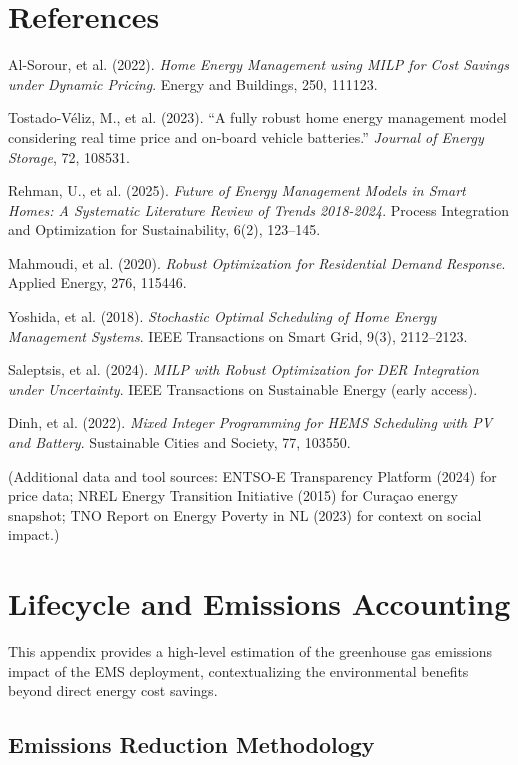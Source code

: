 \documentclass[12pt,a4paper]{article}
\begin{document}
\clearpage

\section*{References}

Al-Sorour, et al. (2022). \textit{Home Energy Management using MILP for Cost Savings under Dynamic Pricing}. Energy and Buildings, 250, 111123.

Tostado-Véliz, M., et al. (2023). “A fully robust home energy management model considering real time price and on-board vehicle batteries.” \textit{Journal of Energy Storage}, 72, 108531.

Rehman, U., et al. (2025). \textit{Future of Energy Management Models in Smart Homes: A Systematic Literature Review of Trends 2018-2024}. Process Integration and Optimization for Sustainability, 6(2), 123–145.

Mahmoudi, et al. (2020). \textit{Robust Optimization for Residential Demand Response}. Applied Energy, 276, 115446.

Yoshida, et al. (2018). \textit{Stochastic Optimal Scheduling of Home Energy Management Systems}. IEEE Transactions on Smart Grid, 9(3), 2112–2123.

Saleptsis, et al. (2024). \textit{MILP with Robust Optimization for DER Integration under Uncertainty}. IEEE Transactions on Sustainable Energy (early access).

Dinh, et al. (2022). \textit{Mixed Integer Programming for HEMS Scheduling with PV and Battery}. Sustainable Cities and Society, 77, 103550.

(Additional data and tool sources: ENTSO-E Transparency Platform (2024) for price data; NREL Energy Transition Initiative (2015) for Curaçao energy snapshot; TNO Report on Energy Poverty in NL (2023) for context on social impact.)

\clearpage

\appendix
\section{Lifecycle and Emissions Accounting}\label{app:emissions}

This appendix provides a high-level estimation of the greenhouse gas emissions impact of the EMS deployment, contextualizing the environmental benefits beyond direct energy cost savings.

\subsection{Emissions Reduction Methodology}
\end{document}
